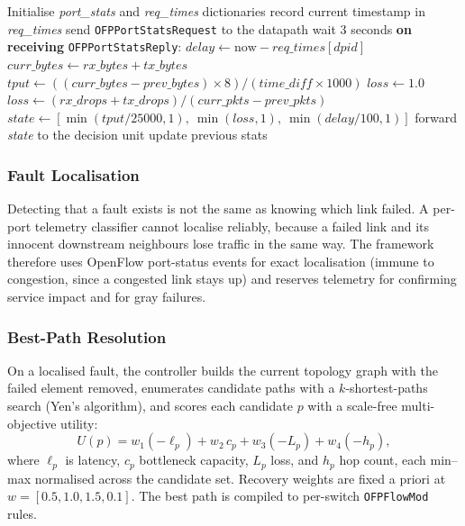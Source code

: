 \documentclass[12pt,a4paper]{report}
\begin{document}
\begin{algorithm}[t]
\caption{Real-time telemetry extraction and normalisation via Ryu}
\label{alg:telemetry}
\begin{algorithmic}[1]
\State Initialise \textit{port\_stats} and \textit{req\_times} dictionaries
    \State record current timestamp in \textit{req\_times}
    \State send \texttt{OFPPortStatsRequest} to the datapath
  \EndFor
  \State wait 3 seconds
\EndWhile
\Statex
\State \textbf{on receiving} \texttt{OFPPortStatsReply}:
\State $\textit{delay} \gets \text{now} - \textit{req\_times}[\textit{dpid}]$
  \State $\textit{curr\_bytes} \gets \textit{rx\_bytes} + \textit{tx\_bytes}$
    \State $\textit{tput} \gets ((\textit{curr\_bytes}-\textit{prev\_bytes})\times 8)/
      (\textit{time\_diff}\times 1000)$
     \State $\textit{loss} \gets 1.0$ 
    \Else \State $\textit{loss} \gets (\textit{rx\_drops}+\textit{tx\_drops})/
      (\textit{curr\_pkts}-\textit{prev\_pkts})$ \EndIf
    \State $\textit{state} \gets [\min(\textit{tput}/25000,1),\ \min(\textit{loss},1),\
      \min(\textit{delay}/100,1)]$
    \State forward \textit{state} to the decision unit
  \EndIf
  \State update previous stats
\EndFor
\end{algorithmic}
\end{algorithm}

\subsubsection{Fault Localisation}
Detecting that a fault exists is not the same as knowing which link failed. A per-port
telemetry classifier cannot localise reliably, because a failed link and its innocent
downstream neighbours lose traffic in the same way. The framework therefore uses OpenFlow
port-status events for exact localisation (immune to congestion, since a congested link
stays up) and reserves telemetry for confirming service impact and for gray failures.

\subsubsection{Best-Path Resolution}
On a localised fault, the controller builds the current topology graph with the failed
element removed, enumerates candidate paths with a $k$-shortest-paths search (Yen's
algorithm), and scores each candidate $p$ with a scale-free multi-objective utility:
\begin{equation}
U(p) = w_1(-\ell_p) + w_2\, c_p + w_3(-L_p) + w_4(-h_p),
\label{eq:objective}
\end{equation}
where $\ell_p$ is latency, $c_p$ bottleneck capacity, $L_p$ loss, and $h_p$ hop count, each
min--max normalised across the candidate set. Recovery weights are fixed a priori at
$w=[0.5,1.0,1.5,0.1]$. %
The best path is compiled to per-switch \texttt{OFPFlowMod} rules.
\end{document}
